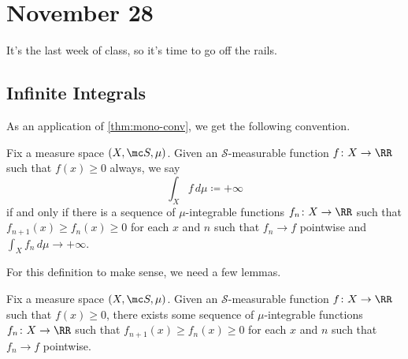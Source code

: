 \documentclass[../notes.tex]{subfiles}
\begin{document}
\section{November 28}

It's the last week of class, so it's time to go off the rails.

\subsection{Infinite Integrals}
As an application of \autoref{thm:mono-conv}, we get the following convention.
\begin{defi}
	Fix a measure space $(X,\mc S,\mu)$. Given an $\mathcal S$-measurable function $f\colon X\to\RR$ such that $f(x)\ge0$ always, we say
	\[\int_Xf\,d\mu\coloneqq+\infty\]
	if and only if there is a sequence of $\mu$-integrable functions $f_n\colon X\to\RR$ such that $f_{n+1}(x)\ge f_n(x)\ge0$ for each $x$ and $n$ such that $f_n\to f$ pointwise and $\int_Xf_n\,d\mu\to+\infty$.
\end{defi}
For this definition to make sense, we need a few lemmas.
\begin{lemma} \label{lem:get-monotone-seq-below}
	Fix a measure space $(X,\mc S,\mu)$. Given an $\mathcal S$-measurable function $f\colon X\to\RR$ such that $f(x)\ge0$, there exists some sequence of $\mu$-integrable functions $f_n\colon X\to\RR$ such that $f_{n+1}(x)\ge f_n(x)\ge0$ for each $x$ and $n$ such that $f_n\to f$ pointwise.
\end{lemma}
\end{document}
